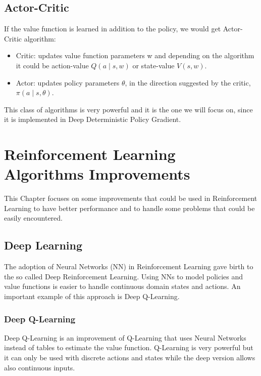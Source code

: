 \documentclass[binding=0.6cm,Lau,oneside]{sapthesis} %
\begin{document}
\section{Actor-Critic}
If the value function is learned in addition to the policy, we would get Actor-Critic algorithm:
\begin{itemize}
	\item Critic: updates value function parameters w and depending on the algorithm it could be action-value $Q(a\mid s,w)$ or state-value $V(s,w)$.
	\item Actor: updates policy parameters $\theta$, in the direction suggested by the critic, $\pi(a\mid s,\theta)$.
\end{itemize}
This class of algorithms is very powerful and it is the one we will focus on, since it is implemented in Deep Deterministic Policy Gradient.
\chapter{Reinforcement Learning Algorithms Improvements}
This Chapter focuses on some improvements that could be used in Reinforcement Learning to have better performance and to handle some problems that could be easily encountered.
\section{Deep Learning}
The adoption of Neural Networks (NN) in Reinforcement Learning gave birth to the so called Deep Reinforcement Learning. Using NNs to model policies and value functions is easier to handle continuous domain states and actions. An important example of this approach is Deep Q-Learning.
\subsection{Deep Q-Learning}
Deep Q-Learning is an improvement of Q-Learning that uses Neural Networks instead of tables to estimate the value function. Q-Learning is very powerful but it can only be used with discrete actions and states while the deep version allows also continuous inputs.
\end{document}

